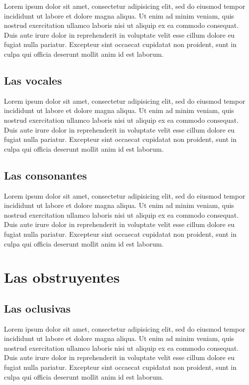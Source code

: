 \documentclass[
]{book}
\begin{document}
Lorem ipsum dolor sit amet, consectetur adipisicing elit, sed do eiusmod
tempor incididunt ut labore et dolore magna aliqua. Ut enim ad minim veniam,
quis nostrud exercitation ullamco laboris nisi ut aliquip ex ea commodo
consequat. Duis aute irure dolor in reprehenderit in voluptate velit esse
cillum dolore eu fugiat nulla pariatur. Excepteur sint occaecat cupidatat non
proident, sunt in culpa qui officia deserunt mollit anim id est laborum.

\hypertarget{las-vocales}{%
\section{Las vocales}\label{las-vocales}}

Lorem ipsum dolor sit amet, consectetur adipisicing elit, sed do eiusmod
tempor incididunt ut labore et dolore magna aliqua. Ut enim ad minim veniam,
quis nostrud exercitation ullamco laboris nisi ut aliquip ex ea commodo
consequat. Duis aute irure dolor in reprehenderit in voluptate velit esse
cillum dolore eu fugiat nulla pariatur. Excepteur sint occaecat cupidatat non
proident, sunt in culpa qui officia deserunt mollit anim id est laborum.

\hypertarget{las-consonantes}{%
\section{Las consonantes}\label{las-consonantes}}

Lorem ipsum dolor sit amet, consectetur adipisicing elit, sed do eiusmod
tempor incididunt ut labore et dolore magna aliqua. Ut enim ad minim veniam,
quis nostrud exercitation ullamco laboris nisi ut aliquip ex ea commodo
consequat. Duis aute irure dolor in reprehenderit in voluptate velit esse
cillum dolore eu fugiat nulla pariatur. Excepteur sint occaecat cupidatat non
proident, sunt in culpa qui officia deserunt mollit anim id est laborum.

\hypertarget{obstruyentes}{%
\chapter{Las obstruyentes}\label{obstruyentes}}

\hypertarget{las-oclusivas}{%
\section{Las oclusivas}\label{las-oclusivas}}

Lorem ipsum dolor sit amet, consectetur adipisicing elit, sed do eiusmod
tempor incididunt ut labore et dolore magna aliqua. Ut enim ad minim veniam,
quis nostrud exercitation ullamco laboris nisi ut aliquip ex ea commodo
consequat. Duis aute irure dolor in reprehenderit in voluptate velit esse
cillum dolore eu fugiat nulla pariatur. Excepteur sint occaecat cupidatat non
proident, sunt in culpa qui officia deserunt mollit anim id est laborum.
\end{document}
